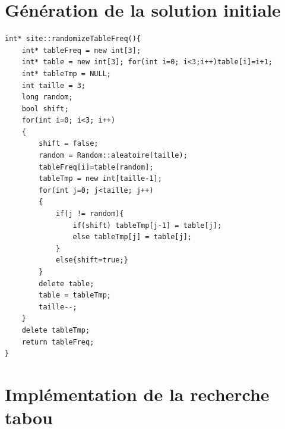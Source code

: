 \documentclass[a4paper, 11pt]{report}
\begin{document}
\chapter{Génération de la solution initiale}
\begin{lstlisting}
int* site::randomizeTableFreq(){
    int* tableFreq = new int[3];
    int* table = new int[3]; for(int i=0; i<3;i++)table[i]=i+1;
    int* tableTmp = NULL;
    int taille = 3;
    long random;
    bool shift;
    for(int i=0; i<3; i++)
    {
        shift = false;
        random = Random::aleatoire(taille);
        tableFreq[i]=table[random];
        tableTmp = new int[taille-1];
        for(int j=0; j<taille; j++)
        {
            if(j != random){
                if(shift) tableTmp[j-1] = table[j];
                else tableTmp[j] = table[j];
            }
            else{shift=true;}
        }
        delete table;
        table = tableTmp;
        taille--;
    }
    delete tableTmp;
    return tableFreq;
}
\end{lstlisting}

\chapter{Implémentation de la recherche tabou}
\begin{lstlisting}
\end{lstlisting}
\end{document}
